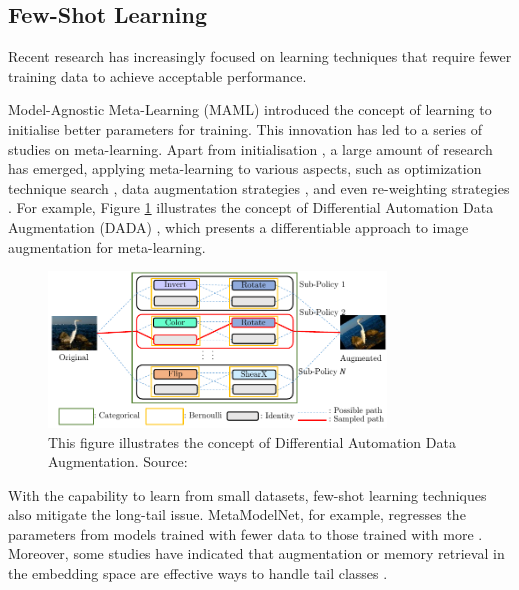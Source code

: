 \subsection{Few-Shot Learning}
Recent research has increasingly focused on learning techniques that require fewer training data to achieve acceptable performance.

Model-Agnostic Meta-Learning (MAML) \parencite{finn2017model} introduced the concept of learning to initialise better parameters for training. This innovation has led to a series of studies on meta-learning. Apart from initialisation \parencite{nichol2018first, 2018Reptile}, a large amount of research has emerged, applying meta-learning to various aspects, such as optimization technique search \parencite{andrychowicz2016learning}, data augmentation strategies \parencite{li2020dada, galashov2022data, cubuk2018autoaugment}, and even re-weighting strategies \parencite{shu2019meta}. For example, Figure \ref{fig:concetpdada} illustrates the concept of Differential Automation Data Augmentation (DADA) \parencite{li2020dada}, which presents a differentiable approach to image augmentation for meta-learning.

\begin{figure}[ht]
    \centering
    \includegraphics[width=0.8\textwidth]{assets/charts_rw/DADA}
    \caption[Illustration of Differential Automation Data Augmentation]{This figure illustrates the concept of Differential Automation Data Augmentation. Source: \parencite{li2020dada}}
    \label{fig:concetpdada}
\end{figure}

With the capability to learn from small datasets, few-shot learning techniques also mitigate the long-tail issue. MetaModelNet, for example, regresses the parameters from models trained with fewer data to those trained with more \parencite{NIPS2017_147ebe63}. Moreover, some studies have indicated that augmentation or memory retrieval in the embedding space are effective ways to handle tail classes \parencite{liu2019large, Zhu_2020_CVPR, li2021metasaug, Fu_2022_ACCV}.

